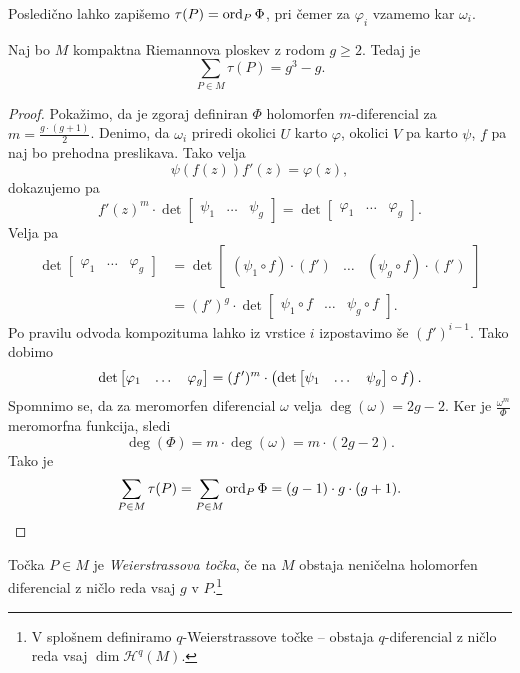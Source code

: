 Posledično lahko zapišemo $\tau(P) = \operatorname{ord}_P \Phi$, pri čemer za
$\varphi_i$ vzamemo kar $\omega_i$.

\begin{trditev}
Naj bo $M$ kompaktna Riemannova ploskev z rodom $g \geq 2$. Tedaj
je
\[
\sum_{P \in M} \tau(P) = g^3-g.
\]
\end{trditev}

\begin{proof}
Pokažimo, da je zgoraj definiran $\Phi$ holomorfen $m$-diferencial
za $m = \frac{g \cdot (g+1)}{2}$. Denimo, da $\omega_i$ priredi
okolici $U$ karto $\varphi$, okolici $V$ pa karto $\psi$, $f$ pa
naj bo prehodna preslikava. Tako velja
\[
\psi(f(z)) f'(z) = \varphi(z),
\]
dokazujemo pa
\[
f'(z)^m \cdot \det
\begin{bmatrix}
\psi_1 & \dots & \psi_g
\end{bmatrix}
=
\det
\begin{bmatrix}
\varphi_1 & \dots & \varphi_g
\end{bmatrix}.
\]
Velja pa
\begin{align*}
\det
\begin{bmatrix}
\varphi_1 & \dots & \varphi_g
\end{bmatrix}
&=
\det
\begin{bmatrix}
(\psi_1 \circ f) \cdot (f') & \dots & (\psi_g \circ f) \cdot (f')
\end{bmatrix}
\\
&=
(f')^g \cdot \det
\begin{bmatrix}
\psi_1 \circ f & \dots & \psi_g \circ f
\end{bmatrix}.
\end{align*}
Po pravilu odvoda kompozituma lahko iz vrstice $i$ izpostavimo še
$(f')^{i-1}$. Tako dobimo
\[
\det
\begin{bmatrix}
\varphi_1 & \dots & \varphi_g
\end{bmatrix}
=
(f')^m \cdot \left(\det
\begin{bmatrix}
\psi_1 & \dots & \psi_g
\end{bmatrix}
\circ f\right).
\]
Spomnimo se, da za meromorfen diferencial $\omega$ velja
$\deg (\omega) = 2g - 2$. Ker je $\frac{\omega^m}{\Phi}$ meromorfna
funkcija, sledi
\[
\deg (\Phi) = m \cdot \deg (\omega) = m \cdot (2g - 2).
\]
Tako je
\[
\sum_{P \in M} \tau(P) =
\sum_{P \in M} \operatorname{ord}_P \Phi =
(g-1) \cdot g \cdot (g+1). \qedhere
\]
\end{proof}

\begin{definicija}
Točka $P \in M$ je \emph{Weierstrassova točka}, če na $M$ obstaja
neničelna holomorfen diferencial z ničlo reda vsaj $g$ v
$P$.\footnote{V splošnem definiramo $q$-Weierstrassove točke --
obstaja $q$-diferencial z ničlo reda vsaj $\dim \mathscr{H}^q(M)$.}
\end{definicija}

